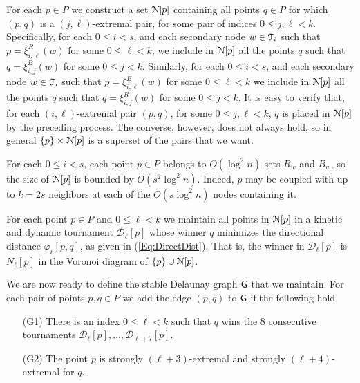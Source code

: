 \documentclass[letter,11pt]{article}
\def\NN{\EuScript{N}}
\def\dirtour{{\mathcal D}}
\def\T{\EuScript{T}}
\def\Nbrs{N}
\def\G{{\sf G}}
\begin{document}
For each $p\in P$ we construct a set $\NN[p]$ containing all points $q\in
P$ for which $(p,q)$ is a $(j,\ell)$-extremal pair, for some pair of indices $0\leq j,\ell< k$. Specifically, for
each $0\le i < s$, and each secondary node $w\in \T_i$ such that
$p=\xi^R_{i,\ell}(w)$ for some $0 \le \ell < k$, we include in
$\NN[p]$ all the points $q$ such that $q=\xi^B_{i,j}(w)$ for some $0 \le
j < k$. Similarly,
for each $0\le i < s$, and each secondary node
$w\in \T_i$ such that $p=\xi^B_{i,\ell}(w)$ for some $0 \le \ell <
k$ we include in $\NN[p]$ all the points $q$ such that
$q=\xi^R_{i,j}(w)$ for some $0 \le j < k$.
It is easy to verify that, for each $(i,\ell)$-extremal pair $(p,q)$, for some $0\leq j,\ell<k$,
$q$ is placed in $\NN[p]$ by the preceding process. The converse, however, does not always hold, so in general $\{p\}\times\NN[p]$ is a superset of
the pairs that we want. 

For each $0\leq i< s$, each
point $p\in P$ belongs to $O(\log^2n)$ sets $R_w$ and $B_w$, so the size of
$\NN[p]$ is bounded by $O(s^2\log^2n)$. Indeed, $p$ may be coupled with up to $k=2s$ neighbors at each of the $O(s\log^2n)$ nodes containing it.

For each point $p\in P$ and $0\leq \ell < k$ we 
maintain all points in $\NN[p]$ in a kinetic and dynamic
tournament $\dirtour_\ell[p]$ whose winner $q$ minimizes
the directional distance $\varphi_\ell[p,q]$, as given in (\ref{Eq:DirectDist}). That is, 
the winner in $\dirtour_\ell[p]$ is $\Nbrs_\ell[p]$ in the Voronoi diagram of
$\{p\}\cup \NN[p]$. 

We are now ready to define the stable Delaunay graph $\G$ that we maintain.
For each pair of points $p,q\in
P$ we add the edge $(p,q)$ to $\G$ if 
the following hold.
\begin{itemize}
\item[(G1)] There is an index $0\leq \ell < k$ such that $q$ wins the 8
consecutive tournaments $\dirtour_\ell[p],\ldots,\dirtour_{\ell+7}[p]$.
\item[(G2)] The point $p$ is strongly $(\ell+3)$-extremal and strongly
$(\ell+4)$-extremal for $q$.
\end{itemize}
\end{document}
